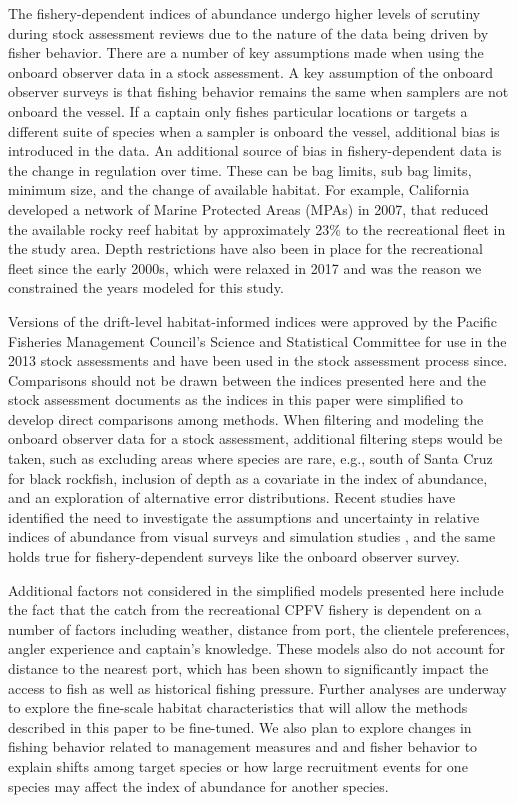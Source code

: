\documentclass[
  12pt,
  authoryear,
  preprint,
  3p]{elsarticle}
\begin{document}
The fishery-dependent indices of abundance undergo higher levels of
scrutiny during stock assessment reviews due to the nature of the data
being driven by fisher behavior. There are a number of key assumptions
made when using the onboard observer data in a stock assessment. A key
assumption of the onboard observer surveys is that fishing behavior
remains the same when samplers are not onboard the vessel. If a captain
only fishes particular locations or targets a different suite of species
when a sampler is onboard the vessel, additional bias is introduced in
the data. An additional source of bias in fishery-dependent data is the
change in regulation over time. These can be bag limits, sub bag limits,
minimum size, and the change of available habitat. For example,
California developed a network of Marine Protected Areas (MPAs) in 2007,
that reduced the available rocky reef habitat by approximately 23\% to
the recreational fleet in the study area. Depth restrictions have also
been in place for the recreational fleet since the early 2000s, which
were relaxed in 2017 and was the reason we constrained the years modeled
for this study.

Versions of the drift-level habitat-informed indices were approved by
the Pacific Fisheries Management Council's Science and Statistical
Committee for use in the 2013 stock assessments and have been used in
the stock assessment process since. Comparisons should not be drawn
between the indices presented here and the stock assessment documents as
the indices in this paper were simplified to develop direct comparisons
among methods. When filtering and modeling the onboard observer data for
a stock assessment, additional filtering steps would be taken, such as
excluding areas where species are rare, e.g., south of Santa Cruz for
black rockfish, inclusion of depth as a covariate in the index of
abundance, and an exploration of alternative error distributions. Recent
studies have identified the need to investigate the assumptions and
uncertainty in relative indices of abundance from visual surveys
\citep{Bacheler:2015:ERA, Campbell:2015:CRA} and simulation studies
\citep{Siegfried:2016:ISA}, and the same holds true for
fishery-dependent surveys like the onboard observer survey.

Additional factors not considered in the simplified models presented
here include the fact that the catch from the recreational CPFV fishery
is dependent on a number of factors including weather, distance from
port, the clientele preferences, angler experience and captain's
knowledge. These models also do not account for distance to the nearest
port, which has been shown to significantly impact the access to fish as
well as historical fishing pressure. Further analyses are underway to
explore the fine-scale habitat characteristics that will allow the
methods described in this paper to be fine-tuned. We also plan to
explore changes in fishing behavior related to management measures and
and fisher behavior to explain shifts among target species or how large
recruitment events for one species may affect the index of abundance for
another species.
\end{document}
